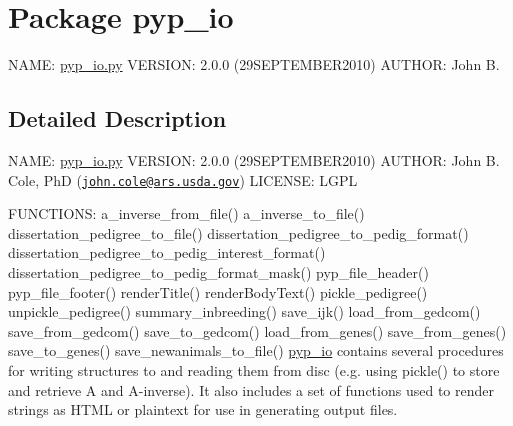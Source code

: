 \hypertarget{namespacepyp__io}{
\section{Package pyp\_\-io}
\label{namespacepyp__io}
}


NAME: \hyperlink{pyp__io_8py_source}{pyp\_\-io.py} VERSION: 2.0.0 (29SEPTEMBER2010) AUTHOR: John B.  




\subsection{Detailed Description}
NAME: \hyperlink{pyp__io_8py_source}{pyp\_\-io.py} VERSION: 2.0.0 (29SEPTEMBER2010) AUTHOR: John B. Cole, PhD (\href{mailto:john.cole@ars.usda.gov}{\tt john.cole@ars.usda.gov}) LICENSE: LGPL

FUNCTIONS: a\_\-inverse\_\-from\_\-file() a\_\-inverse\_\-to\_\-file() dissertation\_\-pedigree\_\-to\_\-file() dissertation\_\-pedigree\_\-to\_\-pedig\_\-format() dissertation\_\-pedigree\_\-to\_\-pedig\_\-interest\_\-format() dissertation\_\-pedigree\_\-to\_\-pedig\_\-format\_\-mask() pyp\_\-file\_\-header() pyp\_\-file\_\-footer() renderTitle() renderBodyText() pickle\_\-pedigree() unpickle\_\-pedigree() summary\_\-inbreeding() save\_\-ijk() load\_\-from\_\-gedcom() save\_\-from\_\-gedcom() save\_\-to\_\-gedcom() load\_\-from\_\-genes() save\_\-from\_\-genes() save\_\-to\_\-genes() save\_\-newanimals\_\-to\_\-file() \hyperlink{namespacepyp__io}{pyp\_\-io} contains several procedures for writing structures to and reading them from disc (e.g. using pickle() to store and retrieve A and A-\/inverse). It also includes a set of functions used to render strings as HTML or plaintext for use in generating output files. 